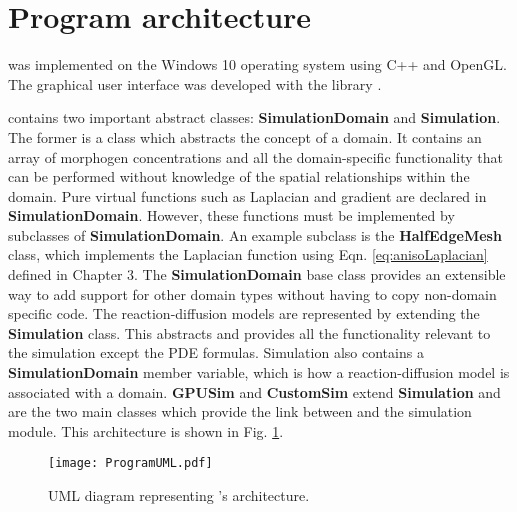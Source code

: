 \section{Program architecture} 
\ProgramName{} was implemented on the Windows 10 operating system using C++ and OpenGL. The graphical user interface was developed with the library  \citep{cornut2019}.

\ProgramName{} contains two important abstract classes: \textbf{SimulationDomain} and \textbf{Simulation}. The former is a class which abstracts the concept of a domain. It contains an array of morphogen concentrations and all the domain-specific functionality that can be performed without knowledge of the spatial relationships within the domain. Pure virtual functions such as Laplacian and gradient are declared in \textbf{SimulationDomain}. However, these functions must be implemented by subclasses of \textbf{SimulationDomain}. An example subclass is the \textbf{HalfEdgeMesh} class, which implements the Laplacian function using Eqn. \ref{eq:anisoLaplacian} defined in Chapter 3. The \textbf{SimulationDomain} base class provides an extensible way to add support for other domain types without having to copy non-domain specific code. The reaction-diffusion models are represented by extending the \textbf{Simulation} class. This abstracts and provides all the functionality relevant to the simulation except the PDE formulas. Simulation also contains a \textbf{SimulationDomain} member variable, which is how a reaction-diffusion model is associated with a domain. \textbf{GPUSim} and \textbf{CustomSim} extend \textbf{Simulation} and are the two main classes which provide the link between \ProgramName{} and the simulation module. This architecture is shown in Fig. \ref{fig:umlDiagram}.

\begin{figure}[H]
	\centering
	\texttt{[image: ProgramUML.pdf]}
	\caption[UML diagram representing \ProgramName{}'s architecture]{UML diagram representing \ProgramName{}'s architecture.}
	\label{fig:umlDiagram}
\end{figure}

